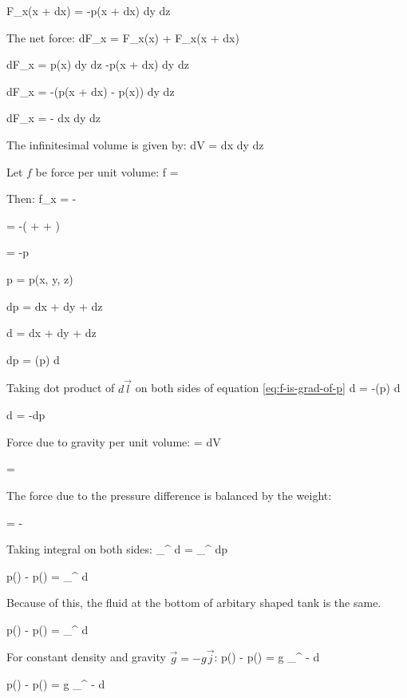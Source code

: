 	\eqb
		F_x(x + dx) = -p(x + dx) dy dz
	\eqe
	
	The net force:
	\eqb
		dF_x = F_x(x) + F_x(x + dx)
	\eqe
	
	\eqb
		dF_x = p(x) dy dz  -p(x + dx) dy dz
	\eqe
	
	\eqb
		dF_x = -(p(x + dx) - p(x)) dy dz
	\eqe
	
	\eqb
		dF_x = - dx dy dz
	\eqe
	
	The infinitesimal volume is given by:
	\eqb
		dV = dx dy dz
	\eqe
	
	Let $f$ be force per unit volume:
	\eqb
		f = 
	\eqe
	
	Then:
	\eqb
		f_x = -
	\eqe
	
	\eqb
		 = -\left( 
		  
			+  
			+  
			\right)
	\eqe
	
	\eqb \label{eq:f-is-grad-of-p}
		 = -\nabla p
	\eqe
	
	\eqb
		p = p(x, y, z)
	\eqe
	
	\eqb
		dp =  dx
			+  dy
			+  dz
	\eqe
	
	\eqb
		d = dx  + dy  + dz 
	\eqe
	
	\eqb
		dp = (\nabla p) \cdot d
	\eqe
	
	Taking dot product of $d\vec{l}$ on both sides of equation \ref{eq:f-is-grad-of-p}
	\eqb
		 \cdot d = -(\nabla p) \cdot d 
	\eqe
	
	\eqb
		 \cdot d = -dp 
	\eqe
	
	Force due to gravity per unit volume:
	\eqb
		 = \rho dV 
	\eqe
	
	\eqb
		 = \rho  {}
	\eqe
	
	The force due to the pressure difference is balanced by the weight:
	
	\eqb
		 = -
	\eqe
	

	Taking integral on both sides:
	\eqb
		\int_{}^{}  \cdot d
			= \int_{}^{} dp 
	\eqe
	
	\eqb
		p() - p() = \int_{}^{}  \cdot d
	\eqe
	
	Because of this, the fluid at the bottom of arbitary shaped tank is the same.
	
	\eqb
		p() - p() = \int_{}^{} \rho {} \cdot d
	\eqe
	
	For constant density and gravity $\vec{g} = -g\vec{j}$:
	\eqb
		p() - p() = \rho g \int_{}^{} - \cdot d
	\eqe
	
	\eqb
		p() - p() = \rho g \int_{}^{} - \cdot d
	\eqe
	
